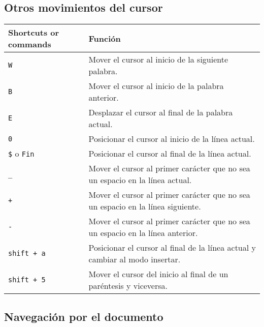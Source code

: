 \documentclass[
  doc,
  floatsintext,
  longtable,
  a4paper,
  nolmodern,
  notxfonts,
  notimes,
  colorlinks=true,linkcolor=blue,citecolor=blue,urlcolor=blue]{apa7}
\begin{document}
\subsection{Otros movimientos del
cursor}\label{otros-movimientos-del-cursor}

\begin{longtable}[]{@{}
  >{\raggedright\arraybackslash}p{}
  >{\raggedright\arraybackslash}p{}@{}}
\toprule\noalign{}
\begin{minipage}[b]{\linewidth}\raggedright
Shortcuts or commands
\end{minipage} & \begin{minipage}[b]{\linewidth}\raggedright
Función
\end{minipage} \\
\midrule\noalign{}
\endhead
\bottomrule\noalign{}
\endlastfoot
\texttt{W} & Mover el cursor al inicio de la siguiente palabra. \\
\texttt{B} & Mover el cursor al inicio de la palabra anterior. \\
\texttt{E} & Desplazar el cursor al final de la palabra actual. \\
\texttt{0} & Posicionar el cursor al inicio de la línea actual. \\
\texttt{\$} o \texttt{Fin} & Posicionar el cursor al final de la línea
actual. \\
\texttt{\_} & Mover el cursor al primer carácter que no sea un espacio
en la línea actual. \\
\texttt{+} & Mover el cursor al primer carácter que no sea un espacio en
la línea siguiente. \\
\texttt{-} & Mover el cursor al primer carácter que no sea un espacio en
la línea anterior. \\
\texttt{shift\ +\ a} & Posicionar el cursor al final de la línea actual
y cambiar al modo insertar. \\
\texttt{shift\ +\ 5} & Mover el cursor del inicio al final de un
paréntesis y viceversa. \\
\end{longtable}

\subsection{Navegación por el
documento}\label{navegaciuxf3n-por-el-documento}
\end{document}
